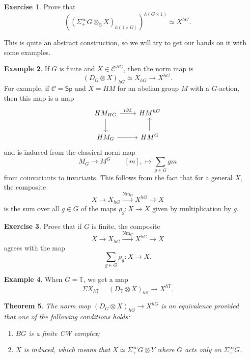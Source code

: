 \documentclass[10pt, oneside]{memoir}
\newtheorem{thm}{Theorem}[subsection]
\theoremstyle{definition}
\newtheorem{exm}[thm]{Example}
\newtheorem{exer}[thm]{Exercise}
\theoremstyle{remark}
\theoremstyle{plain}
\theoremstyle{definition}
\theoremstyle{remark}
\newcommand{\bS}{\mathbb{S}}
\newcommand{\mc}[1]{\mathcal{#1}}
\newcommand{\T}{\mathbb{T}}
\newcommand{\mr}[1]{\mathrm{#1}}
\newcommand{\ms}[1]{\mathsf{#1}}
\newcommand{\1}{\mathbf{1}}
\newcommand{\2}{\mathbf{2}}
\newcommand{\3}{\mathbf{3}}
\begin{document}
\begin{exer}
    Prove that
    \[ ((\Sigma_+^{\infty} G \otimes_{\bS} X)_{h(1 \times G)})^{h(G \times 1)} \simeq X^{hG}. \]
\end{exer}

This is quite an abstract construction, so we will try to get our hands on it with some examples.

\begin{exm}
    If $G$ is finite and $X \in \mc{C}^{BG}$, then the norm map is
    \[ (D_G \otimes X)_{hG} \simeq X_{hG} \to X^{hG}. \]
    For example, if $\mc{C} = \ms{Sp}$ and $X = HM$ for an abelian group $M$ with a $G$-action, then this map is a map
    \begin{equation*}
    \begin{tikzcd}
        HM_{HG} \ar{r}{\mr{nM}} \ar{d} & HM^{hG} \\
        H M_G \ar{r} & H M^G \ar{u}
    \end{tikzcd}
    \end{equation*}
    and is induced from the classical norm map
    \[ M_G \to M^G \qquad [m], \mapsto \sum_{g \in G} gm \]
    from coinvariants to invariants.
    This follows from the fact that for a general $X$, the composite
    \[ X \to X_{hG} \xrightarrow{\mr{Nm}_G} X^{hG} \to X \]
    is the sum over all $g \in G$ of the maps $\rho_g \colon X \to X$ given by multiplication by $g$.
\end{exm}

\begin{exer}
    Prove that if $G$ is finite, the composite
    \[ X \to X_{hG} \xrightarrow{\mr{Nm}_G} X^{hG} \to X \]
    agrees with the map
    \[ \sum_{g \in G} \rho_g \colon X \to X. \]
\end{exer}

\begin{exm}
    When $G = \T$, we get a map
    \[ \Sigma X_{h\T} = (D_{\T} \otimes X)_{h\T} \to X^{h\T}. \]
\end{exm}

\begin{thm}
    The norm map $(D_G \otimes X)_{hG} \to X^{hG}$ is an equivalence provided that one of the following conditions holds:
    \begin{enumerate}
        \item $BG$ is a finite CW complex;
        \item $X$ is induced, which means that $X \simeq \Sigma_+^{\infty} G \otimes Y$ where $G$ acts only on $\Sigma_+^{\infty} G$.
    \end{enumerate}
\end{thm}
\end{document}
